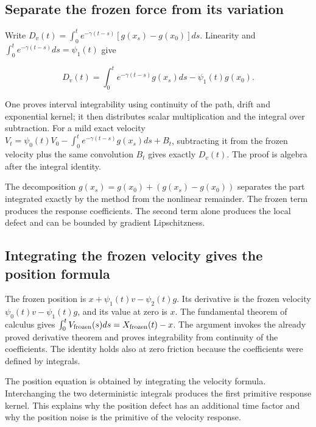 \documentclass[11pt,a4paper]{report}
\begin{document}
\subsection{\texorpdfstring{Separate the frozen force from its variation}{Separate the frozen force from its variation}}
\label{report-step-KineticLangevin-MildError-lean-1}


Write \(D_v(t)=\int_0^t e^{-\gamma(t-s)}[g(x_s)-g(x_0)]ds\). Linearity and \(\int_0^t e^{-\gamma(t-s)}ds=\psi_1(t)\) give

\[D_v(t)=\int_0^t e^{-\gamma(t-s)}g(x_s)ds-\psi_1(t)g(x_0).\]

One proves interval integrability using continuity of the path, drift and exponential kernel; it then distributes scalar multiplication and the integral over subtraction. For a mild exact velocity \(V_t=\psi_0(t)V_0-\int_0^t e^{-\gamma(t-s)}g(x_s)ds+B_t\), subtracting it from the frozen velocity plus the same convolution \(B_t\) gives exactly \(D_v(t)\). The proof is algebra after the integral identity.



The decomposition \(g(x_s)=g(x_0)+(g(x_s)-g(x_0))\) separates the part integrated exactly by the method from the nonlinear remainder. The frozen term produces the response coefficients. The second term alone produces the local defect and can be bounded by gradient Lipschitzness.

\subsection{\texorpdfstring{Integrating the frozen velocity gives the position formula}{Integrating the frozen velocity gives the position formula}}
\label{report-step-KineticLangevin-MildError-lean-2}


The frozen position is \(x+\psi_1(t)v-\psi_2(t)g\). Its derivative is the frozen velocity \(\psi_0(t)v-\psi_1(t)g\), and its value at zero is \(x\). The fundamental theorem of calculus gives \(\int_0^t V_{\rm frozen}(s)ds=X_{\rm frozen}(t)-x\). The argument invokes the already proved derivative theorem and proves integrability from continuity of the coefficients. The identity holds also at zero friction because the coefficients were defined by integrals.



The position equation is obtained by integrating the velocity formula. Interchanging the two deterministic integrals produces the first primitive response kernel. This explains why the position defect has an additional time factor and why the position noise is the primitive of the velocity response.
\end{document}
